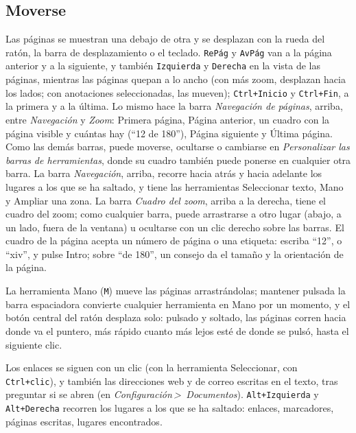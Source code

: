 \documentclass[12pt,
              article,
              oneside
              ]{memoir}
\newcommand*{\menu}[1]{\textit{#1}}
\newcommand*{\then}{\,>\,}
\newcommand*{\key}[1]{\texttt{#1}}
\begin{document}
\subsection{Moverse}

%
Las páginas se muestran una debajo de otra y se desplazan con la rueda del
ratón, la barra de desplazamiento o el teclado. \key{RePág} y \key{AvPág}
van a la página anterior y a la siguiente, y también \key{Izquierda} y
\key{Derecha} en la vista de las páginas, mientras las páginas quepan a lo
ancho (con más zoom, desplazan hacia los lados; con anotaciones
seleccionadas, las mueven); \key{Ctrl+Inicio} y
\key{Ctrl+Fin}, a la primera y a la última. Lo mismo hace la barra \menu{Navegación de
páginas}, arriba, entre \menu{Navegación} y \menu{Zoom}: Primera página, Página anterior, un cuadro
con la página visible y cuántas hay (\enquote{12 de 180}), Página
siguiente y Última página. Como las demás barras, puede moverse, ocultarse
o cambiarse en \menu{Personalizar las barras de herramientas}, donde su
cuadro también puede ponerse en cualquier otra barra. La barra
\menu{Navegación}, arriba, recorre hacia atrás y hacia adelante los lugares
a los que se ha saltado, y tiene las herramientas Seleccionar texto, Mano y
Ampliar una zona. La barra \menu{Cuadro del zoom}, arriba a la derecha,
tiene el cuadro del zoom; como cualquier barra, puede arrastrarse a otro
lugar (abajo, a un lado, fuera de la ventana) u ocultarse con un clic
derecho sobre las barras. El cuadro de la página acepta un número de página
o una etiqueta: escriba \enquote{12}, o \enquote{xiv}, y pulse Intro;
sobre \enquote{de 180}, un consejo da el tamaño y la orientación de la
página.

%
La herramienta Mano (\key{M}) mueve las páginas arrastrándolas; mantener
pulsada la barra espaciadora convierte cualquier herramienta en Mano por un
momento, y el botón central del ratón desplaza solo: pulsado y soltado, las
páginas corren hacia donde va el puntero, más rápido cuanto más lejos esté
de donde se pulsó, hasta el siguiente clic.

%
Los enlaces se siguen con un clic (con la herramienta Seleccionar, con
\key{Ctrl+clic}), y también las direcciones web y de correo escritas en el
texto, tras preguntar si se abren (en \menu{Configuración\then
Documentos}). \key{Alt+Izquierda} y \key{Alt+Derecha} recorren los lugares
a los que se ha saltado: enlaces, marcadores, páginas escritas, lugares
encontrados.
\end{document}

